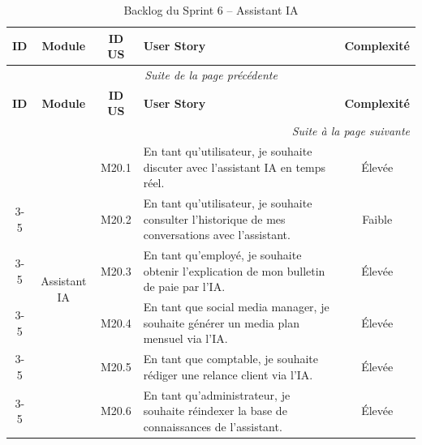 
\begin{longtable}{|c|c|c|p{7.2cm}|c|}
\caption{Backlog du Sprint 6 -- Assistant IA} \label{tab:backlog-sprint-6} \\
\hline
\textbf{ID} & \textbf{Module} & \textbf{ID US} & \textbf{User Story} & \textbf{Complexité} \\
\hline
\endfirsthead

\multicolumn{5}{c}{\textit{Suite de la page précédente}} \\
\hline
\textbf{ID} & \textbf{Module} & \textbf{ID US} & \textbf{User Story} & \textbf{Complexité} \\
\hline
\endhead

\hline \multicolumn{5}{r}{\textit{Suite à la page suivante}} \\
\endfoot

\hline
\endlastfoot

\multirow{6}{*}{M20} & \multirow{6}{*}{Assistant IA} & M20.1 & En tant qu'utilisateur, je souhaite discuter avec l'assistant IA en temps réel. & Élevée \\
\cline{3-5}
 & & M20.2 & En tant qu'utilisateur, je souhaite consulter l'historique de mes conversations avec l'assistant. & Faible \\
\cline{3-5}
 & & M20.3 & En tant qu'employé, je souhaite obtenir l'explication de mon bulletin de paie par l'IA. & Élevée \\
\cline{3-5}
 & & M20.4 & En tant que social media manager, je souhaite générer un media plan mensuel via l'IA. & Élevée \\
\cline{3-5}
 & & M20.5 & En tant que comptable, je souhaite rédiger une relance client via l'IA. & Élevée \\
\cline{3-5}
 & & M20.6 & En tant qu'administrateur, je souhaite réindexer la base de connaissances de l'assistant. & Élevée \\
\hline
\end{longtable}
